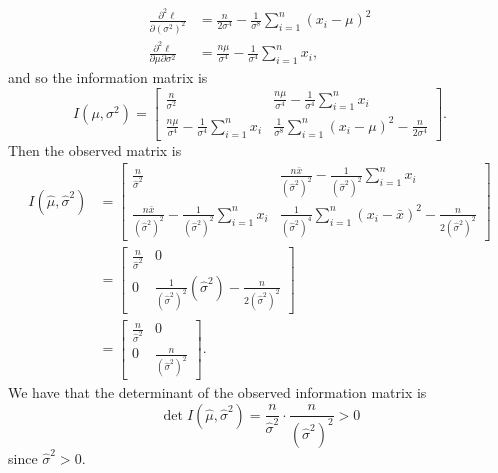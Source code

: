 \documentclass[notoc,notitlepage]{tufte-book}
\begin{document}
\begin{solution}
\begin{enumerate}
\begin{align*}
        \frac{\partial^2 \ell}{\partial (\sigma^2)^2} &= \frac{n}{2 \sigma^4} - \frac{1}{\sigma^8} \sum_{i=1}^{n} (x_i - \mu)^2 \\
        \frac{\partial^2 \ell}{\partial \mu \partial \sigma^2} &= \frac{n \mu}{\sigma^4} - \frac{1}{\sigma^4} \sum_{i=1}^{n} x_i,
      \end{align*}
      and so the information matrix is
      \begin{equation*}
        I\left(\mu, \sigma^2\right) = \begin{bmatrix}
          \frac{n}{\sigma^2} & \frac{n \mu}{\sigma^4} - \frac{1}{\sigma^4} \sum_{i=1}^{n} x_i \\
          \frac{n \mu}{\sigma^4} - \frac{1}{\sigma^4} \sum_{i=1}^{n} x_i & \frac{1}{\sigma^8} \sum_{i=1}^{n} (x_i - \mu)^2 - \frac{n}{2 \sigma^4}
        \end{bmatrix}.
      \end{equation*}
      Then the observed matrix is
      \begin{align*}
        I\left(\hat{\mu}, \hat{\sigma}^2\right) &= \begin{bmatrix}
          \frac{n}{\hat{\sigma}^2} & \frac{n \bar{x}}{\left(\hat{\sigma}^2\right)^2} - \frac{1}{\left(\hat{\sigma}^2\right)^2} \sum_{i=1}^{n} x_i \\
          \frac{n \bar{x}}{\left(\hat{\sigma}^2\right)^2} - \frac{1}{\left(\hat{\sigma}^2\right)^2} \sum_{i=1}^{n} x_i & \frac{1}{\left(\hat{\sigma}^2\right)^4} \sum_{i=1}^{n} (x_i - \bar{x})^2 - \frac{n}{2 \left(\hat{\sigma}^2\right)^2}
        \end{bmatrix} \\
        &= \begin{bmatrix}
        \frac{n}{\hat{\sigma}^2} & 0 \\
        0 & \frac{1}{\left(\hat{\sigma}^2\right)^2} \left( \hat{\sigma}^2 \right) - \frac{n}{2 \left(\hat{\sigma}^2\right)^2}
        \end{bmatrix} \\
        &= \begin{bmatrix}
        \frac{n}{\hat{\sigma}^2} & 0 \\
        0 & \frac{n}{\left(\hat{\sigma}^2\right)^2}
        \end{bmatrix}.
      \end{align*}
      We have that the determinant of the observed information matrix is
      \begin{equation*}
        \det I\left(\hat{\mu}, \hat{\sigma}^2\right) = \frac{n}{\hat{\sigma}^2} \cdot \frac{n}{\left(\hat{\sigma}^2\right)^2} > 0
      \end{equation*}
      since $\hat{\sigma}^2 > 0$.


\end{enumerate}
\end{solution}
\end{document}
